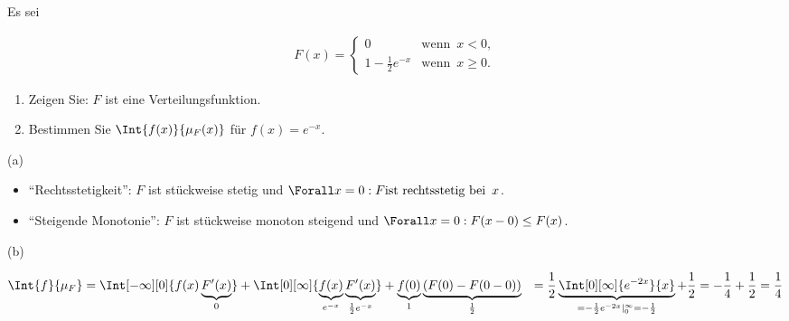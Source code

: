 
\begin{exercise}

Es sei

\begin{align*}
  F(x) =
  \begin{cases}
    0                       & \text{wenn} \enspace x < 0, \\
    1 - \frac{1}{2} e^{-x}  & \text{wenn} \enspace x \geq 0.
  \end{cases}
\end{align*}

\begin{enumerate}[label = (\alph*)]

  \item
  Zeigen Sie: $F$ ist eine Verteilungsfunktion.
  
  \item
  Bestimmen Sie $\Int{f(x)}{\mu_F(x)}$ für $f(x) = e^{-x}$.

\end{enumerate}

\end{exercise}


\begin{solution}

(a) \phantom{}

\begin{itemize}

  \item \enquote{Rechtsstetigkeit}: $F$ ist stückweise stetig und $\Forall x = 0: F \text{ist rechtsstetig bei} \enspace x$.

  \item \enquote{Steigende Monotonie}: $F$ ist stückweise monoton steigend und $\Forall x = 0: F(x - 0) \leq F(x)$.

\end{itemize}

(b)

\begin{align*}
  \Int{f}{\mu_F}
  & =
  \Int[-\infty][0]{f(x) \underbrace{F^\prime(x)}_0}
  +
  \Int[0][\infty]
  {
    \underbrace{f(x)}_{e^{-x}}
    \underbrace{F^\prime(x)}_{\frac{1}{2} e^{-x}}
  }
  +
  \underbrace{f(0)}_1 \underbrace{(F(0) - F(0 - 0))}_\frac{1}{2}
  & =
  \frac{1}{2} \underbrace
  {
    \Int[0][\infty]{e^{-2x}}{x}
  }_{
    = -\frac{1}{2} e^{-2x} |_0^\infty
    = -\frac{1}{2}
  }
  +
  \frac{1}{2}
  =
  -\frac{1}{4} + \frac{1}{2} = \frac{1}{4}
\end{align*}

\end{solution}

